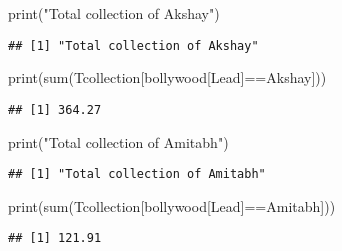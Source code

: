 \documentclass[
]{article}
\newenvironment{Shaded}{\begin{snugshade}}{\end{snugshade}}
\newcommand{\CommentTok}[1]{\textcolor[rgb]{0.56,0.35,0.01}{\textit{#1}}}
\newcommand{\FunctionTok}[1]{\textcolor[rgb]{0.00,0.00,0.00}{#1}}
\newcommand{\NormalTok}[1]{#1}
\newcommand{\SpecialCharTok}[1]{\textcolor[rgb]{0.00,0.00,0.00}{#1}}
\newcommand{\StringTok}[1]{\textcolor[rgb]{0.31,0.60,0.02}{#1}}
\begin{document}
\begin{Shaded}
\begin{Highlighting}[]
\FunctionTok{print}\NormalTok{(}\StringTok{"Total collection of Akshay"}\NormalTok{)}
\end{Highlighting}
\end{Shaded}

\begin{verbatim}
## [1] "Total collection of Akshay"
\end{verbatim}

\begin{Shaded}
\begin{Highlighting}[]
\FunctionTok{print}\NormalTok{(}\FunctionTok{sum}\NormalTok{(Tcollection[bollywood[}\StringTok{\textquotesingle{}Lead\textquotesingle{}}\NormalTok{]}\SpecialCharTok{==}\StringTok{\textquotesingle{}Akshay\textquotesingle{}}\NormalTok{]))}
\end{Highlighting}
\end{Shaded}

\begin{verbatim}
## [1] 364.27
\end{verbatim}

\begin{Shaded}
\begin{Highlighting}[]
\FunctionTok{print}\NormalTok{(}\StringTok{"Total collection of Amitabh"}\NormalTok{)}
\end{Highlighting}
\end{Shaded}

\begin{verbatim}
## [1] "Total collection of Amitabh"
\end{verbatim}

\begin{Shaded}
\begin{Highlighting}[]
\FunctionTok{print}\NormalTok{(}\FunctionTok{sum}\NormalTok{(Tcollection[bollywood[}\StringTok{\textquotesingle{}Lead\textquotesingle{}}\NormalTok{]}\SpecialCharTok{==}\StringTok{\textquotesingle{}Amitabh\textquotesingle{}}\NormalTok{]))}
\end{Highlighting}
\end{Shaded}

\begin{verbatim}
## [1] 121.91
\end{verbatim}

\begin{Shaded}
\end{Shaded}
\end{document}
